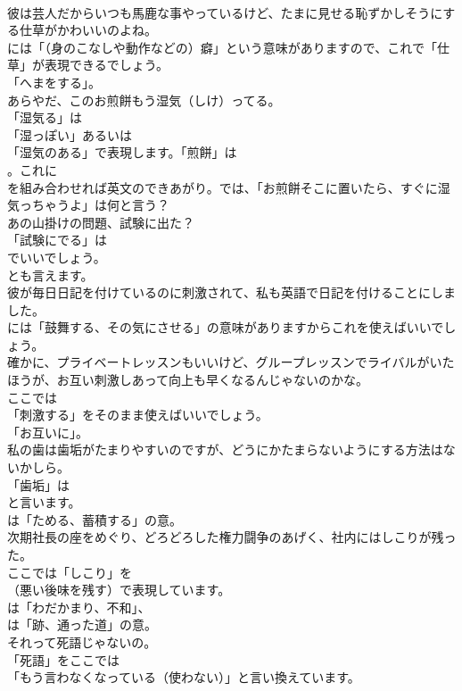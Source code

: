 \documentclass[8pt]{extreport}
\begin{document}
\begin{CJK}{UTF8}{min}
\\	彼は芸人だからいつも馬鹿な事やっているけど、たまに見せる恥ずかしそうにする仕草がかわいいのよね。 
\\	には「（身のこなしや動作などの）癖」という意味がありますので、これで「仕草」が表現できるでしょう。
\\	「へまをする」。	
\\	あらやだ、このお煎餅もう湿気（しけ）ってる。 
\\	「湿気る」は
\\	「湿っぽい」あるいは
\\	「湿気のある」で表現します。「煎餅」は
\\	。これに
\\	を組み合わせれば英文のできあがり。では、「お煎餅そこに置いたら、すぐに湿気っちゃうよ」は何と言う？
\\	あの山掛けの問題、試験に出た？ 
\\	「試験にでる」は
\\	でいいでしょう。
\\	とも言えます。	
\\	彼が毎日日記を付けているのに刺激されて、私も英語で日記を付けることにしました。 
\\	には「鼓舞する、その気にさせる」の意味がありますからこれを使えばいいでしょう。	
\\	確かに、プライベートレッスンもいいけど、グループレッスンでライバルがいたほうが、お互い刺激しあって向上も早くなるんじゃないのかな。 
\\	ここでは
\\	「刺激する」をそのまま使えばいいでしょう。
\\	「お互いに」。	
\\	私の歯は歯垢がたまりやすいのですが、どうにかたまらないようにする方法はないかしら。 
\\	「歯垢」は 
\\	と言います。
\\	は「ためる、蓄積する」の意。	
\\	次期社長の座をめぐり、どろどろした権力闘争のあげく、社内にはしこりが残った。 
\\	ここでは「しこり」を
\\	（悪い後味を残す）で表現しています。
\\	は「わだかまり、不和」、
\\	は「跡、通った道」の意。	
\\	それって死語じゃないの。 
\\	「死語」をここでは
\\	「もう言わなくなっている（使わない）」と言い換えています。	

\end{CJK}
\end{document}
